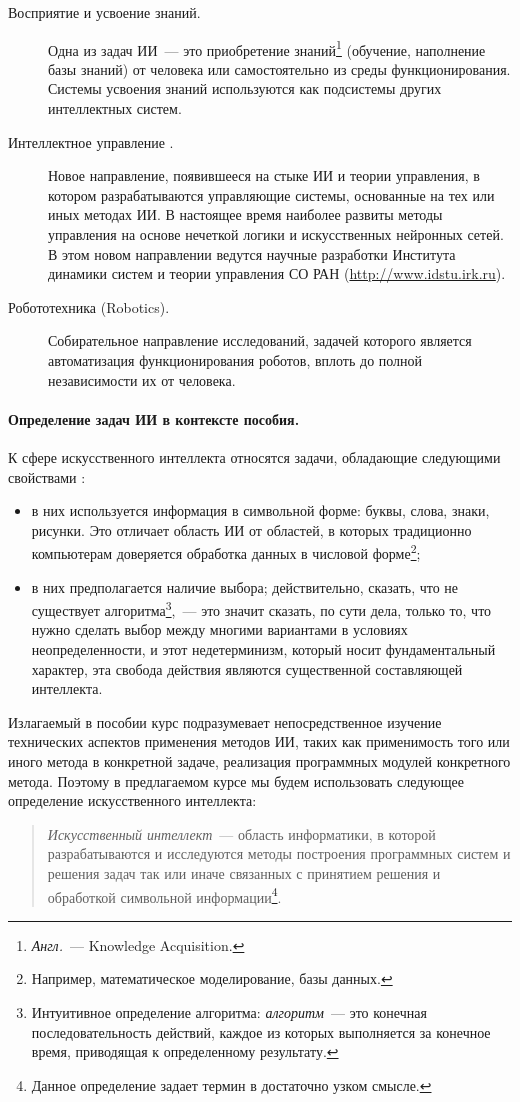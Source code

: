 \documentclass[a4paper,14pt, openany, twoside, draft]{extbook} %
\begin{document}
\begin{description}
 \item [Восприятие и усвоение знаний.] Одна из задач ИИ~--- это приобретение знаний\footnote{\emph{Англ.}~--- Knowledge Acquisition.} (обучение, наполнение базы знаний) от человека или самостоятельно из среды функционирования. Системы усвоения знаний используются как подсистемы других интеллектных систем.
 \item [Интеллектное управление \cite{Vass:2000}.] Новое направление, появившееся на стыке ИИ и теории управления, в котором разрабатываются управляющие системы, основанные на тех или иных методах ИИ. В настоящее время наиболее развиты методы управления на основе нечеткой логики и искусственных нейронных сетей. В этом новом направлении ведутся научные разработки Института динамики систем и теории управления СО РАН (\url{http://www.idstu.irk.ru}).
\item [Робототехника (Robotics).] Собирательное направление исследований, задачей которого является автоматизация функционирования роботов, вплоть до полной независимости их от человека.
\end{description}

\paragraph{Определение задач ИИ в контексте пособия.} К сфере искусственного интеллекта относятся задачи, обладающие следующими свойствами \cite{Lauriere}:
 \begin{itemize}
 \item в них используется информация в символьной форме: буквы, слова, знаки, рисунки. Это отличает область ИИ от областей, в которых традиционно компьютерам доверяется обработка данных в числовой форме\footnote{Например, математическое моделирование, базы данных.};
  \item в них предполагается наличие выбора; действительно, сказать, что не существует алгоритма\footnote{Интуитивное определение алгоритма: \emph{алгоритм}~--- это конечная последовательность действий, каждое из которых выполняется за конечное время, приводящая к определенному результату.},~--- это значит сказать, по сути дела, только то, что нужно сделать выбор между многими вариантами в условиях неопределенности, и этот недетерминизм, который носит фундаментальный характер, эта свобода действия являются существенной составляющей интеллекта.
 \end{itemize}

Излагаемый в пособии курс подразумевает непосредственное изучение технических аспектов применения методов ИИ, таких как применимость того или иного метода в конкретной задаче, реализация программных модулей конкретного метода. Поэтому в предлагаемом курсе мы будем использовать следующее определение искусственного интеллекта:
\begin{quote}{\em
Искусственный интеллект}~--- область информатики, в которой разрабатываются и исследуются методы построения программных систем и решения задач так или иначе связанных с принятием решения и обработкой символьной информации\footnote{Данное определение задает термин в достаточно узком смысле.}.
\end{quote}
\end{document}

